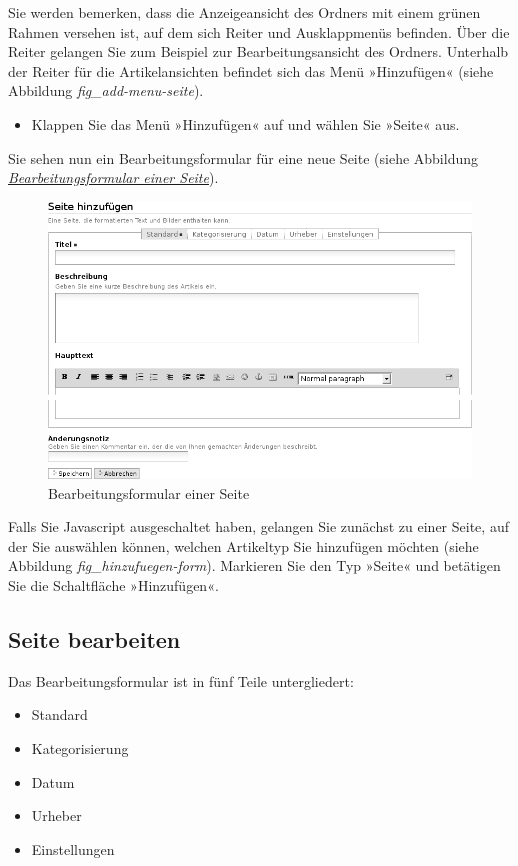\documentclass[a4paper,12pt,ngerman]{manual}
\begin{document}
Sie werden bemerken, dass die Anzeigeansicht des Ordners mit einem grünen
Rahmen versehen ist, auf dem sich Reiter und Ausklappmenüs befinden. Über
die Reiter gelangen Sie zum Beispiel zur Bearbeitungsansicht des
Ordners. Unterhalb der Reiter für die Artikelansichten befindet sich das Menü
»Hinzufügen« (siehe Abbildung \emph{fig\_add-menu-seite}).
\hypertarget{fig-add-menu-seite}{}\begin{itemize}
\item {} 
Klappen Sie das Menü »Hinzufügen« auf und wählen Sie »Seite« aus.

\end{itemize}

Sie sehen nun ein Bearbeitungsformular für eine neue Seite (siehe
Abbildung \hyperlink{fig-homepage-edit-1}{\emph{Bearbeitungsformular einer Seite}}).
\hypertarget{fig-homepage-edit-1}{}\begin{figure}[htbp]
\centering

\includegraphics{homepage-edit-1.png}
\caption{Bearbeitungsformular einer Seite}\end{figure}

Falls Sie Javascript ausgeschaltet haben, gelangen Sie zunächst zu einer
Seite, auf der Sie auswählen können, welchen Artikeltyp Sie hinzufügen
möchten (siehe Abbildung \emph{fig\_hinzufuegen-form}). Markieren Sie den Typ
»Seite« und betätigen Sie die Schaltfläche »Hinzufügen«.


\subsection{Seite bearbeiten}

Das Bearbeitungsformular ist in fünf Teile untergliedert:
\begin{itemize}
\item {} 
Standard

\item {} 
Kategorisierung

\item {} 
Datum

\item {} 
Urheber

\item {} 
Einstellungen

\end{itemize}
\end{document}

